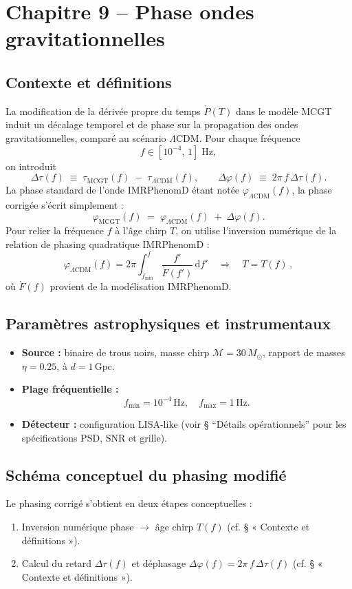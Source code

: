 \section{Chapitre 9 – Phase ondes gravitationnelles }

\subsection{Contexte et définitions}
La modification de la dérivée propre du temps \(\dot P(T)\) dans le modèle MCGT induit un décalage temporel et de phase sur la propagation des ondes gravitationnelles, comparé au scénario \(\Lambda\)CDM. Pour chaque fréquence
\[
  f \in [10^{-4},\,1]\;\mathrm{Hz},
\]
on introduit
\[
  \Delta\tau(f)
  \;\equiv\;
  \tau_{\mathrm{MCGT}}(f)\;-\;\tau_{\Lambda\mathrm{CDM}}(f),
  \qquad
  \Delta\varphi(f)
  \;\equiv\;
  2\pi\,f\,\Delta\tau(f).
\]
La phase standard de l’onde IMRPhenomD étant notée \(\varphi_{\Lambda\mathrm{CDM}}(f)\), la phase corrigée s’écrit simplement :
\[
  \varphi_{\mathrm{MCGT}}(f)
  \;=\;
  \varphi_{\Lambda\mathrm{CDM}}(f)
  \;+\;\Delta\varphi(f).
\]
Pour relier la fréquence \(f\) à l’âge chirp \(T\), on utilise l’inversion numérique de la relation de phasing quadratique IMRPhenomD :
\[
  \varphi_{\Lambda\mathrm{CDM}}(f)
  = 2\pi \int_{f_{\min}}^{f}
    \frac{f'}{\dot F(f')}\,\mathrm{d}f'
  \quad\Longrightarrow\quad
  T = T(f)\,,
\]
où \(\dot F(f)\) provient de la modélisation IMRPhenomD.  

\subsection{Paramètres astrophysiques et instrumentaux}
\begin{itemize}
  \item \textbf{Source :} binaire de trous noirs, masse chirp 
        \(\mathcal{M}=30\,M_{\odot}\), rapport de masses \(\eta=0.25\), à 
        \(d = 1\,\mathrm{Gpc}\).
  \item \textbf{Plage fréquentielle :}
        \[
          f_{\min} = 10^{-4}\,\mathrm{Hz}, 
          \quad
          f_{\max} = 1\,\mathrm{Hz}.
        \]
  \item \textbf{Détecteur :} configuration LISA-like (voir § “Détails opérationnels” pour les spécifications PSD, SNR et grille).
\end{itemize}

\subsection{Schéma conceptuel du phasing modifié}
Le phasing corrigé s’obtient en deux étapes conceptuelles :
\begin{enumerate}
  \item Inversion numérique phase \(\to\) âge chirp \(T(f)\)  
        (cf. § « Contexte et définitions »).
  \item Calcul du retard \(\Delta\tau(f)\) et déphasage  
        \(\Delta\varphi(f)=2\pi\,f\,\Delta\tau(f)\)  
        (cf. § « Contexte et définitions »).
\end{enumerate}

